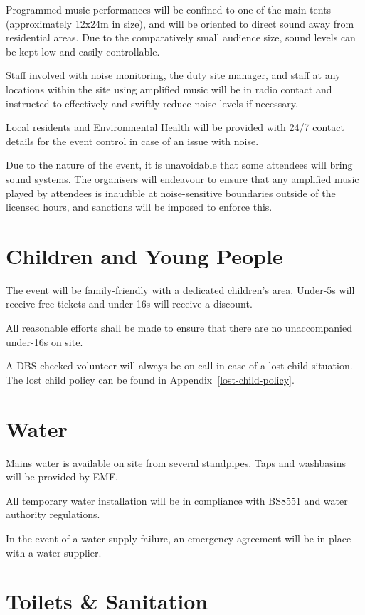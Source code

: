 Programmed music performances will be confined to one of the main tents
(approximately 12x24m in size), and will be oriented to direct sound away from
residential areas. Due to the comparatively small audience size, sound levels
can be kept low and easily controllable.

Staff involved with noise monitoring, the duty site manager, and staff at any
locations within the site using amplified music will be in radio contact and
instructed to effectively and swiftly reduce noise levels if necessary.

Local residents and Environmental Health will be provided with 24/7 contact
details for the event control in case of an issue with noise.

Due to the nature of the event, it is unavoidable that some attendees will
bring sound systems.  The organisers will endeavour to ensure that any
amplified music played by attendees is inaudible at noise-sensitive boundaries
outside of the licensed hours, and sanctions will be imposed to enforce this.

\section{Children and Young People}

The event will be family-friendly with a dedicated children's area. Under-5s will receive free tickets
and under-16s will receive a discount.

All reasonable efforts shall be made to ensure that there are no unaccompanied under-16s on site.

A DBS-checked volunteer will always be on-call in case of a lost child situation. The lost child
policy can be found in Appendix~\ref{lost-child-policy}.

\section{Water}
Mains water is available on site from several standpipes. Taps and washbasins will be provided by EMF.

All temporary water installation will be in compliance with BS8551 and water authority regulations.

In the event of a water supply failure, an emergency agreement will be in place with a water supplier.

\section{Toilets \& Sanitation}

